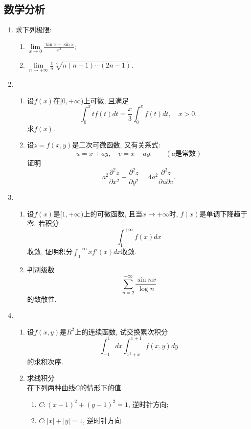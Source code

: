\documentclass[12pt,a4paper,openany]{book}
\begin{document}
\subsection{数学分析}
\begin{enumerate}
\item 求下列极限:
\begin{enumerate}
\item $\displaystyle\lim\limits_{x \rightarrow 0}{\frac{\tan{x} - \sin{x}}{x^3}}$;
\item $\displaystyle\lim\limits_{n \rightarrow +\infty}{\frac{1}{n}\sqrt[n]{n(n+1)\cdots(2n-1)}}$.
\end{enumerate}

\item \begin{enumerate}
\item 设$f(x)$在$[0, +\infty)$上可微, 且满足
\[
\int_{0}^{x}{tf(t)dt} = \frac{x}{3}\int_{0}^{x}{f(t)dt}, \quad x > 0,
\]
求$f(x)$.

\item 设$z = f(x, y)$是二次可微函数, 又有关系式:
\[
u = x + ay, \quad v = x - ay. \qquad (a\text{是常数})
\]
证明
\[
a^2\frac{\partial^2{z}}{\partial{x^2}} - \frac{\partial^2{z}}{\partial{y^2}} = 4a^2\frac{\partial^2{z}}{\partial{u}\partial{v}}.
\]
\end{enumerate}

\item \begin{enumerate}
\item 设$f(x)$是$[1, +\infty)$上的可微函数, 且当$x \rightarrow +\infty$时, $f(x)$是单调下降趋于零. 若积分
\[
\int_{1}^{+\infty}{f(x)dx}
\]
收敛, 证明积分$\displaystyle\int_{1}^{+\infty}{xf'(x)dx}$收敛.

\item 判别级数
\[
\sum_{n=2}^{+\infty}{\frac{\sin{nx}}{\log{n}}}
\]
的敛散性.
\end{enumerate}

\item \begin{enumerate}
\item 设$f(x, y)$是$R^2$上的连续函数, 试交换累次积分
\[
\int_{-1}^{1}{dx}\int_{x^2+x}^{x+1}{f(x, y)dy}
\]
的求积次序.

\item 求线积分
\[
\]
在下列两种曲线$C$的情形下的值.
\begin{enumerate}
\item $C: (x - 1)^2 + (y - 1)^2 = 1$, 逆时针方向;
\item $C: |x| + |y| = 1$, 逆时针方向.
\end{enumerate}
\end{enumerate}

\end{enumerate}
\end{document}
